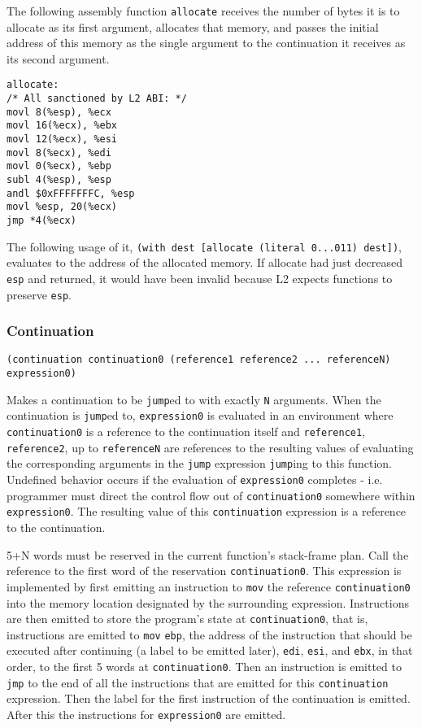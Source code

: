 \documentclass[]{article}
\begin{document}
The following assembly function \texttt{allocate} receives the number of
bytes it is to allocate as its first argument, allocates that memory,
and passes the initial address of this memory as the single argument to
the continuation it receives as its second argument.

\begin{verbatim}
allocate:
/* All sanctioned by L2 ABI: */
movl 8(%esp), %ecx
movl 16(%ecx), %ebx
movl 12(%ecx), %esi
movl 8(%ecx), %edi
movl 0(%ecx), %ebp
subl 4(%esp), %esp
andl $0xFFFFFFFC, %esp
movl %esp, 20(%ecx)
jmp *4(%ecx)
\end{verbatim}

The following usage of it,
\texttt{(with\ dest\ {[}allocate\ (literal\ 0...011)\ dest{]})},
evaluates to the address of the allocated memory. If allocate had just
decreased \texttt{esp} and returned, it would have been invalid because
L2 expects functions to preserve \texttt{esp}.

\hypertarget{continuation}{%
\subsubsection{Continuation}\label{continuation}}

\begin{verbatim}
(continuation continuation0 (reference1 reference2 ... referenceN) expression0)
\end{verbatim}

Makes a continuation to be \texttt{jump}ed to with exactly \texttt{N}
arguments. When the continuation is \texttt{jump}ed to,
\texttt{expression0} is evaluated in an environment where
\texttt{continuation0} is a reference to the continuation itself and
\texttt{reference1}, \texttt{reference2}, up to \texttt{referenceN} are
references to the resulting values of evaluating the corresponding
arguments in the \texttt{jump} expression \texttt{jump}ing to this
function. Undefined behavior occurs if the evaluation of
\texttt{expression0} completes - i.e. programmer must direct the control
flow out of \texttt{continuation0} somewhere within
\texttt{expression0}. The resulting value of this \texttt{continuation}
expression is a reference to the continuation.

5+N words must be reserved in the current function's stack-frame plan.
Call the reference to the first word of the reservation
\texttt{continuation0}. This expression is implemented by first emitting
an instruction to \texttt{mov} the reference \texttt{continuation0} into
the memory location designated by the surrounding expression.
Instructions are then emitted to store the program's state at
\texttt{continuation0}, that is, instructions are emitted to
\texttt{mov} \texttt{ebp}, the address of the instruction that should be
executed after continuing (a label to be emitted later), \texttt{edi},
\texttt{esi}, and \texttt{ebx}, in that order, to the first 5 words at
\texttt{continuation0}. Then an instruction is emitted to \texttt{jmp}
to the end of all the instructions that are emitted for this
\texttt{continuation} expression. Then the label for the first
instruction of the continuation is emitted. After this the instructions
for \texttt{expression0} are emitted.
\end{document}
